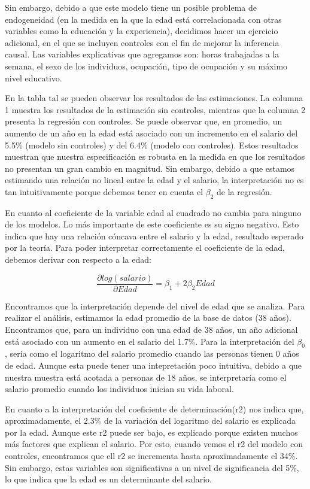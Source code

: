 \documentclass[
  11pt,
  letterpaper,
]{article}
\begin{document}
Sin embargo, debido a que este modelo tiene un posible problema de
endogeneidad (en la medida en la que la edad está correlacionada con
otras variables como la educación y la experiencia), decidimos hacer un
ejercicio adicional, en el que se incluyen controles con el fin de
mejorar la inferencia causal. Las variables explicativas que agregamos
son: horas trabajadas a la semana, el sexo de los individuos, ocupación,
tipo de ocupación y su máximo nivel educativo.

En la tabla tal se pueden observar los resultados de las estimaciones.
La columna 1 muestra los resultados de la estimación sin controles,
mientras que la columna 2 presenta la regresión con controles. Se puede
observar que, en promedio, un aumento de un año en la edad está asociado
con un incremento en el salario del 5.5\% (modelo sin controles) y del
6.4\% (modelo con controles). Estos resultados muestran que nuestra
especificación es robusta en la medida en que los resultados no
presentan un gran cambio en magnitud. Sin embargo, debido a que estamos
estimando una relación no lineal entre la edad y el salario, la
interpretación no es tan intuitivamente porque debemos tener en cuenta
el \(\beta_2\) de la regresión.



En cuanto al coeficiente de la variable edad al cuadrado no cambia para
ninguno de los modelos. Lo más importante de este coeficiente es su
signo negativo. Esto indica que hay una relación cóncava entre el
salario y la edad, resultado esperado por la teoría. Para poder
interpretar correctamente el coeficiente de la edad, debemos derivar con
respecto a la edad:

\[
\frac{\partial log(salario)}{\partial Edad} =\beta_1  +2 \beta_2 Edad
\]

Encontramos que la interpretación depende del nivel de edad que se
analiza. Para realizar el análisis, estimamos la edad promedio de la
base de datos (38 años). Encontramos que, para un individuo con una edad
de 38 años, un año adicional está asociado con un aumento en el salario
del 1.7\%. Para la interpretación del \(\beta_{0}\), sería como el
logaritmo del salario promedio cuando las personas tienen 0 años de
edad. Aunque esta puede tener una intepretación poco intuitiva, debido a
que nuestra muestra está acotada a personas de 18 años, se interpretaría
como el salario promedio cuando los individuos inician su vida laboral.

En cuanto a la interpretación del coeficiente de determinación(r2) nos
indica que, aproximadamente, el 2.3\% de la variación del logaritmo del
salario es explicada por la edad. Aunque este r2 puede ser bajo, es
explicado porque existen muchos más factores que explican el salario.
Por esto, cuando vemos el r2 del modelo con controles, encontramos que
ell r2 se incrementa hasta aproximadamente el 34\%. Sin embargo, estas
variables son significativas a un nivel de significancia del 5\%, lo que
indica que la edad es un determinante del salario.
\end{document}
